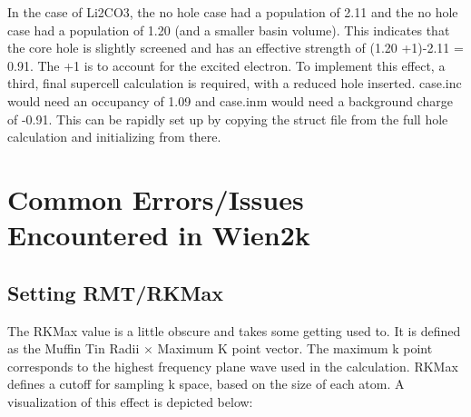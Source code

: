 \documentclass[12pt]{article}
\begin{document}
In the case of Li2CO3, the no hole case had a population of 2.11 and the no hole case had a population of 1.20 (and a smaller basin volume).  This indicates that the core hole is slightly screened and has an effective strength of (1.20 +1)-2.11 = 0.91.  The +1 is to account for the excited electron. To implement this effect, a third, final supercell calculation is required,  with a reduced hole inserted.  case.inc would need an occupancy of 1.09 and case.inm would need a background charge of -0.91. This can be rapidly set up by copying the struct file from the full hole calculation and initializing from there.\\

  
\section{Common Errors/Issues Encountered in Wien2k}

\subsection{Setting RMT/RKMax}
The RKMax value is a little obscure and takes some getting used to.   It is defined as the Muffin Tin Radii $\times$ Maximum K point vector.   The maximum k point corresponds to the highest frequency plane wave used in the calculation. RKMax defines a cutoff for sampling  k space, based on the size of each atom.  A visualization of this effect is depicted below:
\end{document}
